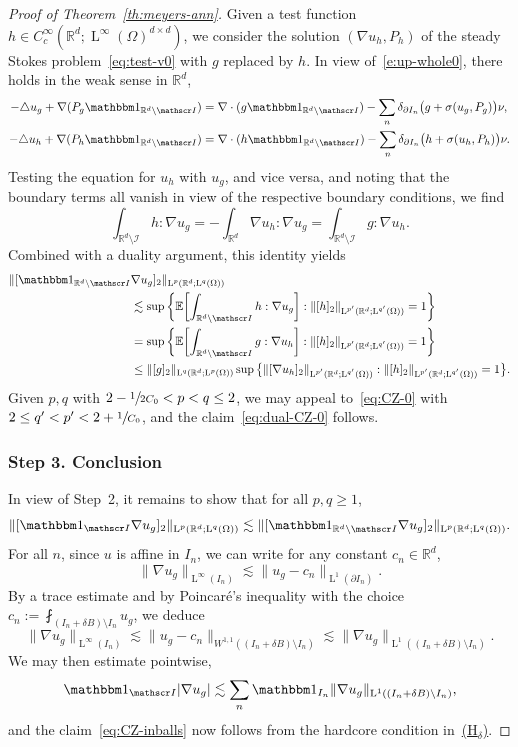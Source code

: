 \documentclass[JEP,XML,SOM,Unicode,published]{cedram}
\let\mathcal\mathscr
\newcommand{\Hd}{\hyperref[Hd]{\textup{(H$_\delta$)}}\xspace}
\let\mathds\mathbbm
\theoremstyle{plain}
\theoremstyle{definition}
\newcommand{\R}{\mathbb R}
\newcommand{\Ic}{\mathcal I}
\newcommand{\Ld}{\operatorname{L}}
\newcommand{\step}[1]{\subsubsection*{Step #1}}
\newcommand{\E}{\mathbb{E}}
\begin{document}
\begin{proof}[Proof of Theorem~\ref{th:meyers-ann}]
Given a test function $h\in C^\infty_c(\R^d;\Ld^\infty(\Omega)^{d\times d})$, we consider the solution $(\nabla u_h,P_h)$ of the steady Stokes problem~\eqref{eq:test-v0} with $g$ replaced by $h$.
In view of~\eqref{e:up-whole0}, there holds in the weak sense in $\R^d$,
\begin{align*}
-\triangle u_g+\nabla(P_g\mathds1_{\R^d\setminus\Ic})&=\nabla\cdot (g\mathds1_{\R^d\setminus\Ic})-\sum_n\delta_{\partial I_{n}}\big(g+\sigma(u_g,P_g)\big)\nu,\\
-\triangle u_h+\nabla(P_h\mathds1_{\R^d\setminus\Ic})&=\nabla\cdot (h\mathds1_{\R^d\setminus\Ic})-\sum_n\delta_{\partial I_{n}}\big(h+\sigma(u_h,P_h)\big)\nu.
\end{align*}
Testing the equation for $u_h$ with $u_g$, and vice versa, and noting that the boundary terms all vanish in view of the respective boundary conditions, we find
\begin{equation*}
\int_{\R^d\setminus\Ic}h:\nabla u_g=-\int_{\R^d}\nabla u_h:\nabla u_g=\int_{\R^d\setminus\Ic}g:\nabla u_h.
\end{equation*}
Combined with a duality argument, this identity yields
\begin{align*}
\|[\mathds1_{\R^d\setminus\Ic}&\nabla u_g]_2\|_{\Ld^{p}(\R^d;\Ld^{q}(\Omega))}\\
&\lesssim\sup\bigg\{\E\bigg[{\int_{\R^d\setminus\Ic}h:\nabla u_g}\bigg] : \|[h]_2\|_{\Ld^{p'}(\R^d;\Ld^{q'}(\Omega))}=1\bigg\}\\
&=\sup\bigg\{\E\bigg[{\int_{\R^d\setminus\Ic}g:\nabla u_h}\bigg] : \|[h]_2\|_{\Ld^{p'}(\R^d;\Ld^{q'}(\Omega))}=1\bigg\}\\
&\le\|[g]_2\|_{\Ld^{q}(\R^d;\Ld^{p}(\Omega))}\sup\big\{\|[\nabla u_h]_2\|_{\Ld^{p'}(\R^d;\Ld^{q'}(\Omega))} : \|[h]_2\|_{\Ld^{p'}(\R^d;\Ld^{q'}(\Omega))}=1\big\}.
\end{align*}
Given $p,q$ with $2-\sfrac1{2C_0}<p<q\le2$, we may appeal to~\eqref{eq:CZ-0} with $2\le q'<p'<2+\sfrac1{C_0}$, and the claim~\eqref{eq:dual-CZ-0} follows.

\step{3. Conclusion}
In view of Step~2, it remains to show that for all $p,q\ge1$,
\begin{equation}\label{eq:CZ-inballs}
\|[\mathds1_{\Ic}\nabla u_g]_2\|_{\Ld^p(\R^d;\Ld^q(\Omega))}\lesssim \|[\mathds1_{\R^d\setminus\Ic}\nabla u_g]_2\|_{\Ld^p(\R^d;\Ld^q(\Omega))}.
\end{equation}
For all $n$, since $u$ is affine in $I_{n}$, we can write for any constant $c_{n}\in\R^d$,
\[\|\nabla u_g\|_{\Ld^\infty(I_{n})}\lesssim \|u_g-c_{n}\|_{\Ld^1(\partial I_{n})}.\]
By a trace estimate and by Poincaré's inequality with the choice $c_{n}:=\fint_{(I_{n}+\delta B)\setminus I_{n}}u_g$, we deduce
\[\|\nabla u_g\|_{\Ld^\infty(I_{n})}\lesssim \|u_g-c_{n}\|_{W^{1,1}((I_{n}+\delta B)\setminus I_{n})}\lesssim \|\nabla u_g\|_{\Ld^1((I_{n}+\delta B)\setminus I_{n})}.\]
We may then estimate pointwise,
\[\mathds1_{\Ic}|\nabla u_g|\lesssim \sum_n\mathds1_{I_{n}}\|\nabla u_g\|_{\Ld^1((I_{n}+\delta B)\setminus I_{n})},\]
and the claim~\eqref{eq:CZ-inballs} now follows from the hardcore condition in~\Hd.
\end{proof}
\end{document}
